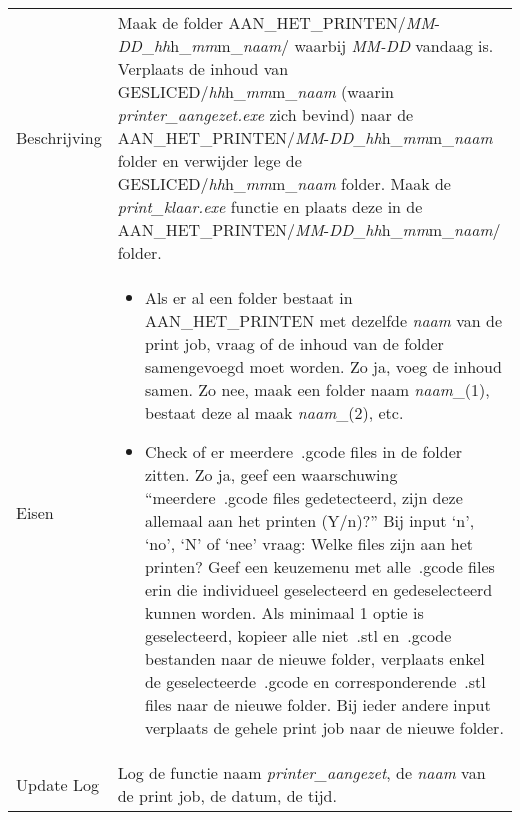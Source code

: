 \documentclass{article}
\newcommand{\quotes}[1]{``#1''}
\begin{document}
\begin{table}[H]
    \centering
    \begin{tabular}%
    {>{\raggedright\arraybackslash}p{}%
    |>{\raggedright\arraybackslash}p{}}
    \rowcolor{myblue} \multicolumn{2}{c}{\rule{0pt}{13pt}Functie: {\Large printer\_aangezet.exe}} \\\hline
    Beschrijving & Maak de folder AAN\_HET\_PRINTEN/\textit{MM}-\textit{DD}\_\textit{hh}h\_\textit{mm}m\_\textit{naam}/ waarbij \textit{MM-DD} vandaag is. Verplaats de inhoud van GESLICED/\textit{hh}h\_\textit{mm}m\_\textit{naam} (waarin \textit{printer\_aangezet.exe} zich bevind) naar de AAN\_HET\_PRINTEN/\textit{MM}-\textit{DD}\_\textit{hh}h\_\textit{mm}m\_\textit{naam} folder en verwijder lege de GESLICED/\textit{hh}h\_\textit{mm}m\_\textit{naam} folder. Maak de \textit{print\_klaar.exe} functie en plaats deze in de AAN\_HET\_PRINTEN/\textit{MM}-\textit{DD}\_\textit{hh}h\_\textit{mm}m\_\textit{naam}/ folder.\\ Eisen & 
    \begin{itemize} 
  \item Als er al een folder bestaat in AAN\_HET\_PRINTEN met dezelfde \textit{naam} van de print job, vraag of de inhoud van de folder samengevoegd moet worden. Zo ja, voeg de inhoud samen. Zo nee, maak een folder naam \textit{naam}\_(1), bestaat deze al maak \textit{naam}\_(2), etc.
  \item Check of er meerdere~.gcode files in de folder zitten. Zo ja, geef een waarschuwing \quotes{meerdere~.gcode files gedetecteerd, zijn deze allemaal aan het printen (Y/n)?} Bij input `n', `no', `N' of `nee' vraag: Welke files zijn aan het printen? Geef een keuzemenu met alle~.gcode files erin die individueel geselecteerd en gedeselecteerd kunnen worden. Als minimaal 1 optie is geselecteerd, kopieer alle niet~.stl en~.gcode bestanden naar de nieuwe folder, verplaats enkel de geselecteerde~.gcode en corresponderende~.stl files naar de nieuwe folder. Bij ieder andere input verplaats de gehele print job naar de nieuwe folder.
\end{itemize} \\
  Update Log&Log de functie naam \textit{printer\_aangezet}, de \textit{naam} van de print job, de datum, de tijd.\\
    \end{tabular}
\end{table}
\end{document}
